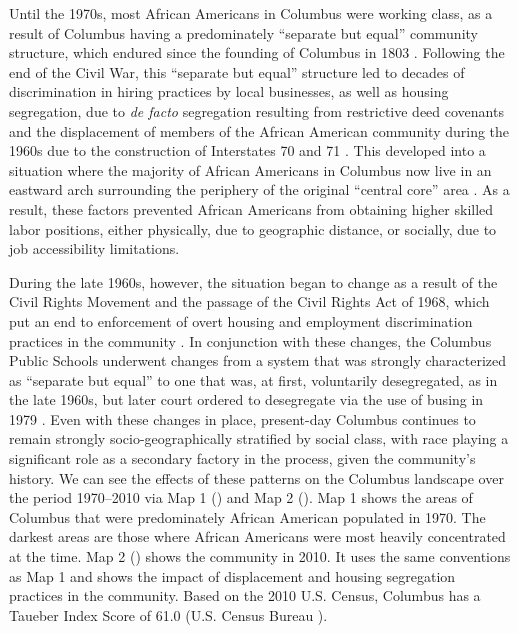 \documentclass[output=paper,colorlinks,citecolor=brown]{langscibook}
\begin{document}
Until the 1970s, most African Americans in Columbus were working class, as a result of Columbus having a predominately “separate but equal” community structure, which endured since the founding of Columbus in 1803 \citep{jacobs1994,james1972}. Following the end of the Civil War, this “separate but equal” structure led to decades of discrimination in hiring practices by local businesses, as well as housing segregation, due to \textit{de facto} segregation resulting from restrictive deed covenants and the displacement of members of the African American community during the 1960s due to the construction of Interstates 70 and 71  \citep{Oriedo1982,burgess1994planning}. This developed into a situation where the majority of African Americans in Columbus now live in an eastward arch surrounding the periphery of the original “central core” area \citep{jacobs1994,reecelindsjo2012}. As a result, these factors prevented African Americans from obtaining higher skilled labor positions, either physically, due to geographic distance, or socially, due to job accessibility limitations.

During the late 1960s, however, the situation began to change as a result of the Civil Rights Movement and the passage of the Civil Rights Act of 1968, which put an end to enforcement of overt housing and employment discrimination practices in the community \citep{jacobs1994}. In conjunction with these changes, the Columbus Public Schools underwent changes from a system that was strongly characterized as “separate but equal” to one that was, at first, voluntarily desegregated, as in the late 1960s, but later court ordered to desegregate via the use of busing in 1979 \citep{foster1997september}. Even with these changes in place, present-day Columbus continues to remain strongly socio-geographically stratified by social class, with race playing a significant role as a secondary factory in the process, given the community's history. We can see the effects of these patterns on the Columbus landscape over the period 1970--2010 via Map 1 () and Map 2 ().  Map 1 shows the areas of Columbus that were predominately African American populated in 1970.  The darkest areas are those where African Americans were most heavily concentrated at the time. Map 2 () shows the community in 2010. It uses the same conventions as Map 1 and shows the impact of displacement and housing segregation practices in the community. Based on the 2010 U.S. Census, Columbus has a Taueber Index Score of 61.0 (U.S. Census Bureau \citeyear{CensusBureau2010}).
\end{document}

